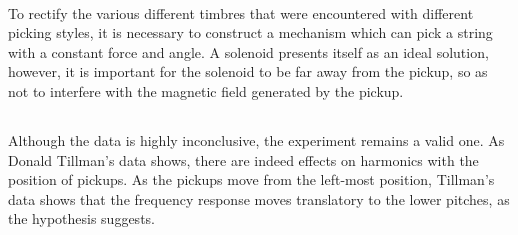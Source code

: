 \documentclass{article}
\begin{document}
\paragraph*{}
To rectify the various different timbres that were encountered with different 
picking styles, it is necessary to construct a mechanism which can pick a 
string with a constant force and angle. A solenoid presents itself as an 
ideal solution, however, it is important for the solenoid to be far away from 
the pickup, so as not to interfere with the magnetic field generated by the 
pickup.

\subsection*{}
\paragraph*{}
Although the data is highly inconclusive, the experiment remains a valid one. 
As Donald Tillman's data shows, there are indeed effects on harmonics with the 
position of pickups. As the pickups move from the left-most position, 
Tillman's data shows that the frequency response moves translatory to the 
lower pitches, as the hypothesis suggests.

\clearpage
\pagebreak
\end{document}
